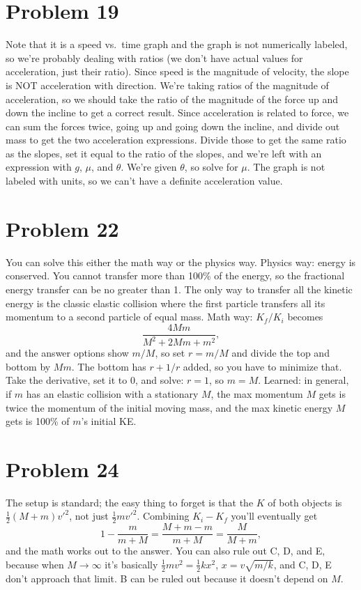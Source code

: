 \documentclass[11pt]{article}
\begin{document}
\section*{Problem 19}
Note that it is a speed vs.\ time graph and the graph is not numerically labeled, so we're probably dealing with ratios (we don't have actual values for acceleration, just their ratio).
Since speed is the magnitude of velocity, the slope is NOT acceleration with direction. We're taking ratios of the magnitude of acceleration, so we should take the ratio of the magnitude of the force up and down the incline to get a correct result.
Since acceleration is related to force, we can sum the forces twice, going up and going down the incline, and divide out mass to get the two acceleration expressions. Divide those to get the same ratio as the slopes, set it equal to the ratio of the slopes, and we're left with an expression with $g$, $\mu$, and $\theta$. We're given $\theta$, so solve for $\mu$.
The graph is not labeled with units, so we can't have a definite acceleration value.

\section*{Problem 22}
You can solve this either the math way or the physics way.
Physics way: energy is conserved. You cannot transfer more than 100\% of the energy, so the fractional energy transfer can be no greater than 1. The only way to transfer all the kinetic energy is the classic elastic collision where the first particle transfers all its momentum to a second particle of equal mass.
Math way: $K_f/K_i$ becomes
\[
\frac{4Mm}{M^2+2Mm+m^2},
\]
and the answer options show $m/M$, so set $r=m/M$ and divide the top and bottom by $Mm$. The bottom has $r+1/r$ added, so you have to minimize that. Take the derivative, set it to $0$, and solve: $r=1$, so $m=M$.
Learned: in general, if $m$ has an elastic collision with a stationary $M$, the max momentum $M$ gets is twice the momentum of the initial moving mass, and the max kinetic energy $M$ gets is 100\% of $m$'s initial KE.

\section*{Problem 24}
The setup is standard; the easy thing to forget is that the $K$ of both objects is $\tfrac12(M+m)v'^2$, not just $\tfrac12mv'^2$. Combining $K_i-K_f$ you'll eventually get
\[
1-\frac{m}{m+M}=\frac{M+m-m}{m+M}=\frac{M}{M+m},
\]
and the math works out to the answer.
You can also rule out C, D, and E, because when $M\to\infty$ it's basically $\tfrac12mv^2=\tfrac12kx^2$, $x=v\sqrt{m/k}$, and C, D, E don't approach that limit. B can be ruled out because it doesn't depend on $M$.
\end{document}
